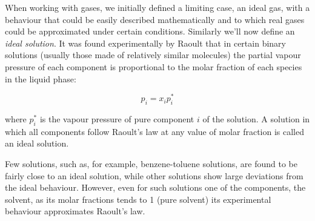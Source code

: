 \documentclass[12pt,a4paper]{report}
\newif\ifstudents
\begin{document}
   When working with gases, we initially defined a limiting case, an ideal gas, with a behaviour that could be easily described mathematically and to which real gases could be approximated under certain conditions. Similarly we'll now define an \textit{ideal solution}.
   It was found experimentally by Raoult that in certain binary solutions (usually those made of relatively similar molecules) the partial vapour pressure of each component is proportional to the molar fraction of each species in the liquid phase:
   \ifstudents \hideit[2]{ \fi
   \begin{equation*}
   p_{i}=x_{i}p^{*}_{i}
   \end{equation*}
   \ifstudents } \fi
   where $p^{*}_{i}$ is the vapour pressure of pure component $i$ of the solution. A solution in which all components follow Raoult's law at any value of molar fraction is called an ideal solution.
   \begin{center}
   \end{center}
   Few solutions, such as, for example, benzene-toluene solutions, are found to be fairly close to an ideal solution, while other solutions show large deviations from the ideal behaviour. However, even for such solutions one of the components, the solvent, as its molar fractions tends to 1 (pure solvent) its experimental behaviour approximates Raoult's law.
   
\end{document}

